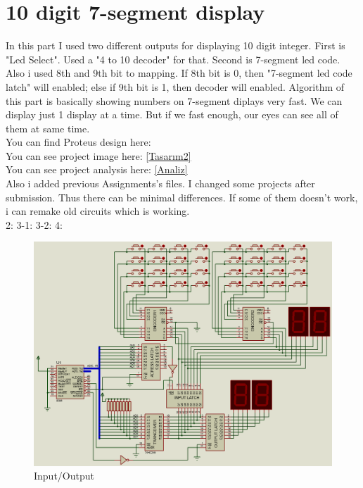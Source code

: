 \documentclass[11pt]{article}
\begin{document}
\section{10 digit 7-segment display}
In this part I used two different outputs for displaying 10 digit integer. First is "Led Select". Used a "4 to 10 decoder" for that. Second is 7-segment led code.\\
Also i used 8th and 9th bit to mapping. If 8th bit is 0, then "7-segment led code latch" will enabled; else if 9th bit is 1, then decoder will enabled.
Algorithm of this part is basically showing numbers on 7-segment diplays very fast. We can display just 1 display at a time. But if we fast enough, our eyes can see all of them at same time.\\
You can find Proteus design here: \\
You can see project image here: \ref{Tasarım2}\\
You can see project analysis here: \ref{Analiz}\\
Also i added previous Assignments's files. I changed some projects after submission. Thus there can be minimal differences. If some of them doesn't work, i can remake old circuits which is working.\\
2:  3-1:  3-2:  4: 
\begin{figure}
	\centering
	\includegraphics[width=21cm]{Tasarım2.png}
	\caption{Input/Output}
	\label{Tasarım}
\end{figure}
\end{document}
